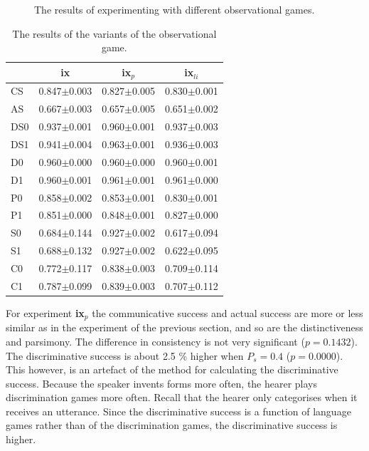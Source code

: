 \begin{figure}[t]
\centering
{}
\caption{The results of experimenting with different observational games.}
\label{f:par:observ}
\end{figure}


\begin{table}
\centering
\begin{tabular}{||l|c|c|c||}
\hline\hline
&    {\bf ix}&        {\bf ix$_p$}& {\bf ix$_{li}$}\\\hline
CS&  0.847$\pm$0.003& 0.827$\pm$0.005& 0.830$\pm$0.001\\\hline 
AS&  0.667$\pm$0.003& 0.657$\pm$0.005&0.651$\pm$0.002\\\hline 
DS0& 0.937$\pm$0.001& 0.960$\pm$0.001&0.937$\pm$0.003\\\hline 
DS1& 0.941$\pm$0.004& 0.963$\pm$0.001&0.936$\pm$0.003\\\hline 
D0&  0.960$\pm$0.000& 0.960$\pm$0.000&0.960$\pm$0.001\\\hline
D1&  0.960$\pm$0.001& 0.961$\pm$0.001&0.961$\pm$0.000\\\hline 
P0&  0.858$\pm$0.002& 0.853$\pm$0.001&0.830$\pm$0.001\\\hline 
P1&  0.851$\pm$0.000& 0.848$\pm$0.001&0.827$\pm$0.000\\\hline 
S0&  0.684$\pm$0.144& 0.927$\pm$0.002&0.617$\pm$0.094\\\hline 
S1&  0.688$\pm$0.132& 0.927$\pm$0.002&0.622$\pm$0.095\\\hline 
C0&  0.772$\pm$0.117& 0.838$\pm$0.003&0.709$\pm$0.114\\\hline 
C1&  0.787$\pm$0.099& 0.839$\pm$0.003&0.707$\pm$0.112\\\hline 
\hline
\end{tabular}
\caption{The results of the variants of the observational game.}
\label{t:par:observ}
\end{table}

For experiment {\bf ix$_p$} the communicative success and actual success are more or less similar as in the experiment of the previous section, and so are the distinctiveness and parsimony. The difference in consistency is not very significant ($p=0.1432$). The discriminative success is about 2.5 \% higher when $P_s=0.4$ ($p=0.0000$). This however, is an artefact of the method for calculating the discriminative success. Because the speaker invents forms more often, the hearer plays discrimination games more often. Recall that the hearer only categorises when it receives an utterance. Since the discriminative success is a function of language games rather than of the discrimination games, the discriminative success is higher.


